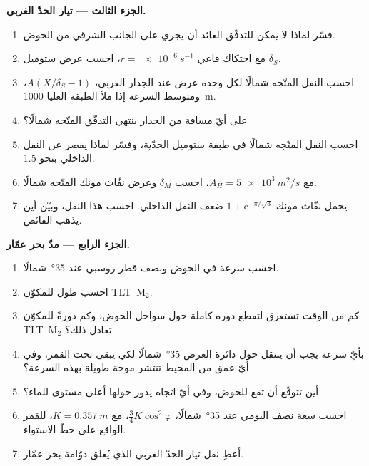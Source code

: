 \begin{problem}
\medskip\noindent\textbf{الجزء الثالث --- تيار الحدّ الغربي.}
\begin{enumerate}[resume]
\item فسّر لماذا لا يمكن للتدفّق العائد أن يجري على الجانب الشرقي من
  الحوض.
\item مع احتكاك قاعي $r = \qty{e-6}{s^{-1}}$، احسب عرض
  ستوميل $\delta_S$.
\item احسب النقل المتّجه شمالًا لكل وحدة عرض عند الجدار الغربي،
  $A(X/\delta_S - 1)$، ومتوسط السرعة إذا ملأ الطبقة العليا
  \qty{1000}{m}.
\item على أيّ مسافة من الجدار ينتهي التدفّق المتّجه شمالًا؟
\item احسب النقل المتّجه شمالًا في طبقة ستوميل الحدّية،
  وفسّر لماذا يقصر عن النقل الداخلي بنحو
  \qty{1.5}{\sverdrup}.
\item مع $A_H = \qty{5e3}{m^2/s}$، احسب $\delta_M$ وعرض
  نفّاث مونك المتّجه شمالًا.
\item يحمل نفّاث مونك $1 + \mathrm e^{-\pi/\sqrt3}$ ضعف
  النقل الداخلي. احسب هذا النقل، وبيّن أين يذهب الفائض.
\end{enumerate}

\medskip\noindent\textbf{الجزء الرابع --- مدّ بحر عمّار.}
\begin{enumerate}[resume]
\item احسب سرعة  في الحوض ونصف قطر روسبي
  عند \ang{35}~شمالًا.
\item احسب طول  للمكوّن \mbox{\textdir TLT M$_2$}.
\item كم من الوقت تستغرق  لتقطع دورة كاملة حول سواحل
  الحوض، وكم دورةً للمكوّن \mbox{\textdir TLT M$_2$} تعادل ذلك؟
\item بأيّ سرعة يجب أن ينتقل  حول
  دائرة العرض \ang{35}~شمالًا لكي يبقى تحت القمر، وفي أيّ عمق من المحيط
  تنتشر موجة طويلة بهذه السرعة؟
\item أين تتوقّع أن تقع  للحوض، وفي أيّ
  اتجاه يدور حولها أعلى مستوى للماء؟
\item احسب سعة  نصف اليومي عند \ang{35}~شمالًا، $\tfrac34
  K\cos^2\varphi$، مع $K = \qty{0.357}{m}$، للقمر الواقع على خطّ الاستواء.
\item أعطِ نقل تيار الحدّ الغربي الذي يُغلق
  دوّامة بحر عمّار.
\end{enumerate}
\end{problem}
